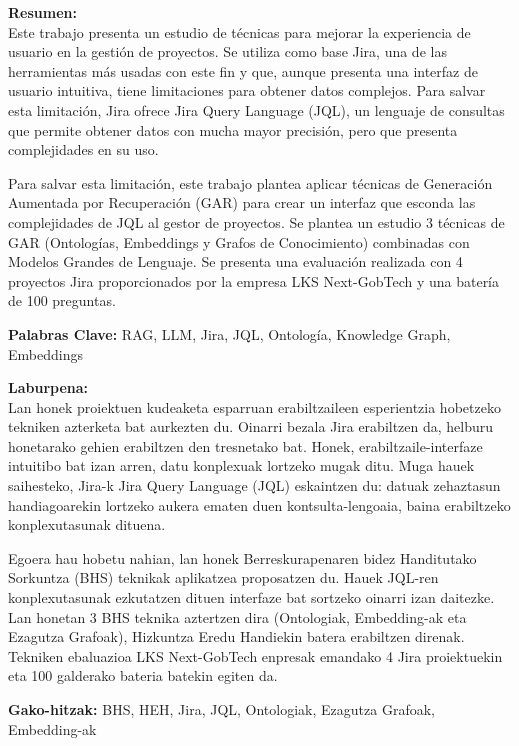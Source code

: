 \begin{itshape}
    \textbf{Resumen:} \\
    Este trabajo presenta un estudio de técnicas para mejorar la experiencia de usuario en la gestión de proyectos. Se utiliza como base Jira, una de las herramientas más usadas con este fin y que, aunque presenta una interfaz de usuario intuitiva, tiene limitaciones para obtener datos complejos. Para salvar esta limitación, Jira ofrece Jira Query Language (JQL), un lenguaje de consultas que permite obtener datos con mucha mayor precisión, pero que presenta complejidades en su uso. 

    Para salvar esta limitación, este trabajo plantea aplicar técnicas de Generación Aumentada por Recuperación (GAR) para crear un interfaz que esconda las complejidades de JQL al gestor de proyectos. Se plantea un estudio 3 técnicas de GAR (Ontologías, Embeddings y Grafos de Conocimiento) combinadas con Modelos Grandes de Lenguaje. Se presenta una evaluación realizada con 4 proyectos Jira proporcionados por la empresa LKS Next-GobTech y una batería de 100 preguntas. 

    
    \textbf{Palabras Clave:} RAG, LLM, Jira, JQL, Ontología, Knowledge Graph, Embeddings
\end{itshape}

\begin{itshape}
    \textbf{Laburpena:} \\
    Lan honek proiektuen kudeaketa esparruan erabiltzaileen esperientzia hobetzeko tekniken azterketa bat aurkezten du. Oinarri bezala Jira erabiltzen da, helburu honetarako gehien erabiltzen den tresnetako bat. Honek, erabiltzaile-interfaze intuitibo bat izan arren, datu konplexuak lortzeko mugak ditu. Muga hauek saihesteko, Jira-k Jira Query Language (JQL) eskaintzen du: datuak zehaztasun handiagoarekin lortzeko aukera ematen duen kontsulta-lengoaia, baina erabiltzeko konplexutasunak dituena.

    Egoera hau hobetu nahian, lan honek Berreskurapenaren bidez Handitutako Sorkuntza (BHS) teknikak aplikatzea proposatzen du. Hauek JQL-ren konplexutasunak ezkutatzen dituen interfaze bat sortzeko oinarri izan daitezke.
    Lan honetan 3 BHS teknika aztertzen dira (Ontologiak, Embedding-ak eta Ezagutza Grafoak), Hizkuntza Eredu Handiekin batera erabiltzen direnak. Tekniken ebaluazioa LKS Next-GobTech enpresak emandako 4 Jira proiektuekin eta 100 galderako bateria batekin egiten da.
    
    \textbf{Gako-hitzak:} BHS, HEH, Jira, JQL, Ontologiak, Ezagutza Grafoak, Embedding-ak
\end{itshape}



